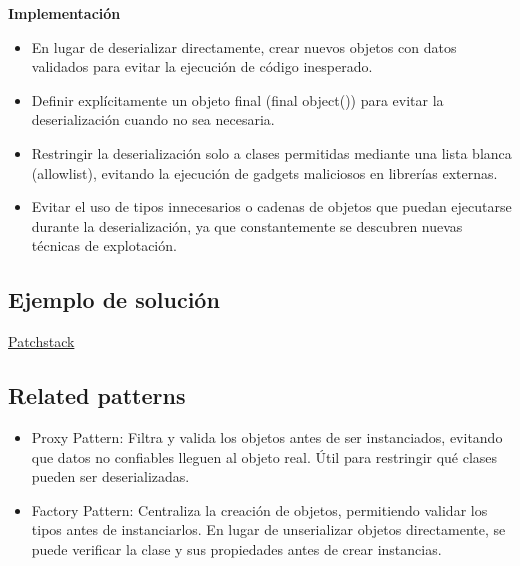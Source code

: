 \textbf{Implementación}
\begin{itemize}
\item En lugar de deserializar directamente, crear nuevos objetos con datos validados para evitar la ejecución de código inesperado.
\item Definir explícitamente un objeto final (final object()) para evitar la deserialización cuando no sea necesaria.
\item Restringir la deserialización solo a clases permitidas mediante una lista blanca (allowlist), evitando la ejecución de gadgets maliciosos en librerías externas.
\item Evitar el uso de tipos innecesarios o cadenas de objetos que puedan ejecutarse durante la deserialización, ya que constantemente se descubren nuevas técnicas de explotación.
\end{itemize}

\subsection*{Ejemplo de solución}
\href{https://patchstack.com/academy/wordpress/securing-code/php-object-injection/}{Patchstack}

\subsection*{Related patterns}
\begin{itemize}
    \item Proxy Pattern: Filtra y valida los objetos antes de ser instanciados, evitando que datos no confiables lleguen al objeto real. Útil para restringir qué clases pueden ser deserializadas.
    \item Factory Pattern: Centraliza la creación de objetos, permitiendo validar los tipos antes de instanciarlos. En lugar de unserializar objetos directamente, se puede verificar la clase y sus propiedades antes de crear instancias.
\end{itemize}

